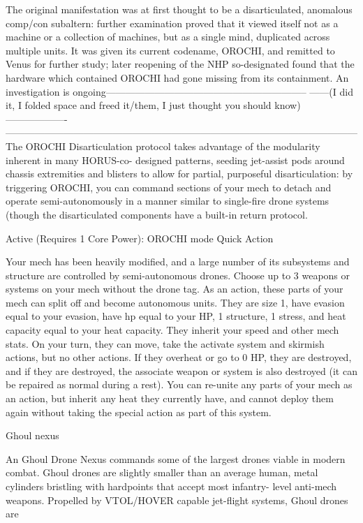   The original manifestation was at first thought to be a disarticulated, anomalous comp/con subaltern:
 further examination proved that it viewed itself not as a machine or a collection of machines, but as a
 single mind, duplicated across multiple units. It was given its current codename, OROCHI, and remitted
  to Venus for further study; later reopening of the NHP so-designated found that the hardware which
 contained OROCHI had gone missing from its containment. An investigation is
 ongoing--------------------------------------------------------------
 ------(I did it, I folded space and freed it/them, I just thought you should know)-------------------
 ------------------------------------------------------------------------------------------------------------
  The OROCHI Disarticulation protocol takes advantage of the modularity inherent in many HORUS-co-
 designed patterns, seeding jet-assist pods around chassis extremities and blisters to allow for partial,
 purposeful disarticulation: by triggering OROCHI, you can command sections of your mech to detach
 and operate semi-autonomously in a manner similar to single-fire drone systems (though the
 disarticulated components have a built-in return protocol.

 Active (Requires 1 Core Power): OROCHI mode
  Quick Action

 Your mech has been heavily modified, and a large number of its subsystems and structure are
  controlled by semi-autonomous drones. Choose up to 3 weapons or systems on your mech without the
  drone tag. As an action, these parts of your mech can split off and become autonomous units. They are
  size 1, have evasion equal to your evasion, have hp equal to your HP, 1 structure, 1 stress, and heat
  capacity equal to your heat capacity. They inherit your speed and other mech stats. On your turn, they
  can move, take the activate system and skirmish actions, but no other actions. If they overheat or go to
  0 HP, they are destroyed, and if they are destroyed, the associate weapon or system is also destroyed
  (it can be repaired as normal during a rest). You can re-unite any parts of your mech as an action, but
  inherit any heat they currently have, and cannot deploy them again without taking the special action as
  part of this system.

Ghoul nexus

An Ghoul Drone Nexus commands some of the largest drones viable in modern combat. Ghoul drones are
slightly smaller than an average human, metal cylinders bristling with hardpoints that accept most infantry-
level anti-mech weapons. Propelled by VTOL/HOVER capable jet-flight systems, Ghoul drones are

